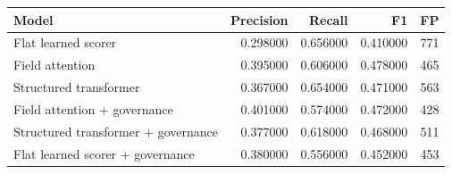 \begin{tabular}{lrrrr}
\toprule
Model & Precision & Recall & F1 & FP \\
\midrule
Flat learned scorer & 0.298000 & 0.656000 & 0.410000 & 771 \\
Field attention & 0.395000 & 0.606000 & 0.478000 & 465 \\
Structured transformer & 0.367000 & 0.654000 & 0.471000 & 563 \\
Field attention + governance & 0.401000 & 0.574000 & 0.472000 & 428 \\
Structured transformer + governance & 0.377000 & 0.618000 & 0.468000 & 511 \\
Flat learned scorer + governance & 0.380000 & 0.556000 & 0.452000 & 453 \\
\bottomrule
\end{tabular}
